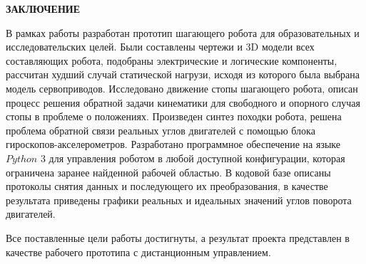 \newpage
\begin{center}
	\textbf{ЗАКЛЮЧЕНИЕ}
\end{center}

В рамках работы разработан прототип шагающего робота для образовательных и исследовательских целей. Были составлены чертежи и 3D модели всех составляющих робота, подобраны электрические и логические компоненты, рассчитан худший случай статической нагрузи, исходя из которого была выбрана модель сервоприводов. Исследовано движение стопы шагающего робота, описан процесс решения обратной задачи кинематики для свободного и опорного случая стопы в проблеме о положениях. Произведен синтез походки робота, решена проблема обратной связи реальных углов двигателей с помощью блока гироскопов-акселерометров. Разработано программное обеспечение на языке $Python$ 3 для управления роботом в любой доступной конфигурации, которая ограничена заранее найденной рабочей областью. В кодовой базе описаны протоколы снятия данных и последующего их преобразования, в качестве результата приведены графики реальных и идеальных значений углов поворота двигателей.

Все поставленные цели работы достигнуты, а результат проекта представлен в качестве рабочего прототипа с дистанционным управлением. 